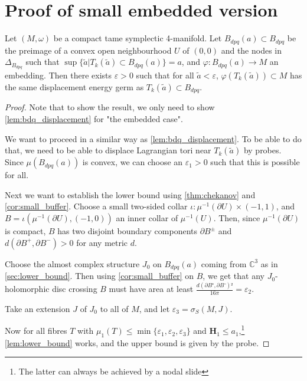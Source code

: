 \documentclass[12pt,a4paper,draft]{scrartcl}
\begin{document}
\section{Proof of small embedded version}


\begin{theorem}
  Let $(M,ω)$ be a compact tame symplectic 4-manifold. Let $B_{dpq}(a) ⊂ B_{dpq}$ be the preimage of a convex open neighbourhood $U$ of $(0,0)$ and the nodes in $Δ_{B_{dpq}}$ such that $\sup\{\tilde{a} | T_k(\tilde{a}) ⊂ B_{dpq}(a)\} = a$, and $φ \colon B_{dpq}(a) → M$ an embedding. Then there exists $ε>0$ such that for all $\tilde{a}<ε$, $φ(T_k(\tilde{a})) ⊂ M$ has the same displacement energy germ as $T_k(\tilde{a}) ⊂ B_{dpq}$.
\end{theorem}

\begin{proof}
  Note that to show the result, we only need to show \cref{lem:bdq_displacement} for "the embedded case".

  We want to proceed in a similar way as \cref{lem:bdq_displacement}. To be able to do that, we need to be able to displace Lagrangian tori near $T_k(\tilde{a})$ by probes. Since $μ(B_{dpq}(a))$ is convex, we can choose an $ε_1>0$ such that this is possible for all.

  Next we want to establish the lower bound using \cref{thm:chekanov} and \cref{cor:small_buffer}. Choose a small two-sided collar $ι \colon μ^{-1}(∂U) × (-1,1)$, and $B = ι(μ^{-1}(∂U), (-1,0))$ an inner collar of $μ^{-1}(U)$.
  Then, since $μ^{-1}(∂U)$ is compact, $B$ has two disjoint boundary components $∂B^±$ and $d(∂B^+,∂B^-) > 0$ for any metric $d$.

  Choose the almost complex structure $J_0$ on $B_{dpq}(a)$ coming from $ℂ^3$ as in \cref{sec:lower_bound}. Then using \cref{cor:small_buffer} on $B$, we get that any $J_0$-holomorphic disc crossing $B$ must have area at least $\frac{d(∂B⁺,∂B⁻)²}{16 π} = ε_2$.

  Take an extension $J$ of $J_0$ to all of $M$, and let $ε_3 = σ_S(M,J)$.

  Now for all fibres $T$ with $μ_1(T) ≤ \min\{ε_1,ε_2,ε_3\}$ and $\symbf{H}_1 ≤ a_1$,\footnote{The latter can always be achieved by a nodal slide} \cref{lem:lower_bound} works, and the upper bound is given by the probe.
\end{proof}
\end{document}
